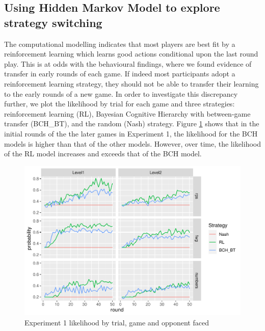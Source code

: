 \documentclass[smallextended]{svjour3}       %
\begin{document}
\hypertarget{using-hidden-markov-model-to-explore-strategy-switching}{%
\subsection{Using Hidden Markov Model to explore strategy
switching}\label{using-hidden-markov-model-to-explore-strategy-switching}}

The computational modelling indicates that most players are best fit by
a reinforcement learning which learns good actions conditional upon the
last round play. This is at odds with the behavioural findings, where we
found evidence of transfer in early rounds of each game. If indeed most
participants adopt a reinforcement learning strategy, they should not be
able to transfer their learning to the early rounds of a new game. In
order to investigate this discrepancy further, we plot the likelihood by
trial for each game and three strategies: reinforcement learning (RL),
Bayesian Cognitive Hierarchy with between-game transfer (BCH\_BT), and
the random (Nash) strategy. Figure \ref{fig:exp1-lik-by-tr} shows that
in the initial rounds of the the later games in Experiment 1, the
likelihood for the BCH models is higher than that of the other models.
However, over time, the likelihood of the RL model increases and exceeds
that of the BCH model.

\begin{figure}

{\centering \includegraphics[width=\textwidth]{CBB_files/figure-latex/exp1-lik-by-tr-1} 

}

\caption{Experiment 1 likelihood by trial, game and opponent faced}\label{fig:exp1-lik-by-tr}
\end{figure}
\end{document}
